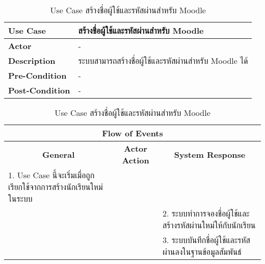 \begin{table}[H]
    \caption{Use Case สร้างชื่อผู้ใช้และรหัสผ่านสำหรับ Moodle}
    \label{tab:usecase-generate-user}
    \begin{tabularx}{\textwidth}{ | p{3cm} | X | }
    \hline
    \textbf{Use Case} & สร้างชื่อผู้ใช้และรหัสผ่านสำหรับ Moodle \\
    \hline
    \textbf{Actor} & - \\
    \hline
    \textbf{Description} & ระบบสามารถสร้างชื่อผู้ใช้และรหัสผ่านสำหรับ Moodle ได้ \\
    \hline
    \textbf{Pre-Condition} & - \\
    \hline
    \textbf{Post-Condition} & - \\
    \hline
    \end{tabularx}
    \begin{tabularx}{\textwidth}{ | X | X | X | }
    \multicolumn{3}{|c|}{\textbf{Flow of Events}} \\
    \hline
    \multicolumn{1}{|c|}{\textbf{General}} & \multicolumn{1}{|c|}{\textbf{Actor Action}} & \multicolumn{1}{|c|}{\textbf{System Response}} \\
    \hline
    1. Use Case นี้จะเริ่มเมื่อถูกเรียกใช้จากการสร้างนักเรียนใหม่ในระบบ & & \\
    \hline
    & & 2. ระบบทำการจองชื่อผู้ใช้และสร้างรหัสผ่านใหม่ให้กับนักเรียน \\
    \hline
    & & 3. ระบบบันทึกชื่อผู้ใช้และรหัสผ่านลงในฐานข้อมูลสัมพันธ์ \\
    \hline
    \end{tabularx}
\end{table}
